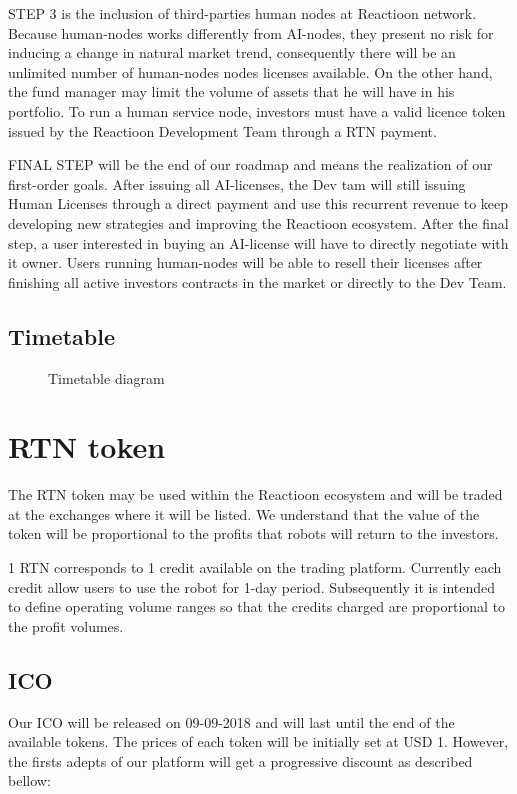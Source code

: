 \documentclass[
	article,			%
	12pt,				%
	oneside,			%
	a4paper,			%
	brazil,				%
	english,
	sumario=tradicional
	]{abntex2}
\begin{document}
STEP 3 is the inclusion of third-parties human nodes at Reactioon network. Because human-nodes works differently from AI-nodes, they present no risk for inducing a change in natural market trend, consequently there will be an unlimited number of human-nodes nodes licenses available. On the other hand, the fund manager may limit the volume of assets that he will have in his portfolio.  To run a human service node, investors must have a valid licence token issued by the Reactioon Development Team through a RTN payment.

FINAL STEP will be the end of our roadmap and means the realization
of our first-order goals. After issuing all AI-licenses, the Dev tam will still issuing Human Licenses through a direct payment and use this recurrent revenue to keep developing new strategies and improving the Reactioon ecosystem. 
After the final step,  a user interested in buying an AI-license will have to directly negotiate with it owner. Users running human-nodes will be able to resell their licenses after finishing all active investors contracts in the market or directly to the Dev Team.
\subsection{Timetable}
\begin{figure}[H]
    \centering
    \makebox[\textwidth]{}
\caption{Timetable diagram}
\end{figure}
\section{RTN token}
The RTN token may be used within the Reactioon ecosystem and will be traded at the exchanges where it will be listed. We understand that the value of the token will be proportional to the profits that robots will return to the investors.

1 RTN corresponds to 1 credit available on the trading platform. Currently each credit allow users to use the robot for 1-day period. Subsequently it is intended to define operating volume ranges so that the credits charged are proportional to the profit volumes.

\subsection{ICO}
Our ICO will be released on 09-09-2018 and will last until the end of the available tokens. The prices of each token will be initially set at USD 1. However, the firsts adepts of our platform will get a progressive discount as described bellow:
\end{document}
